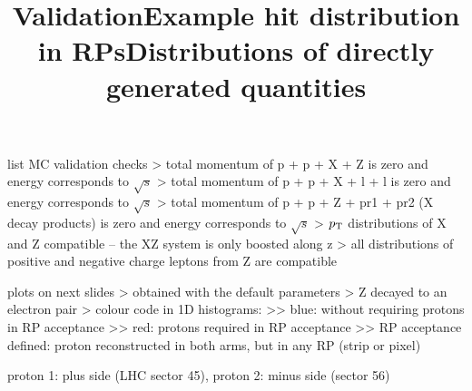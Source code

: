 \newpage %
\title{Validation}

\> list MC validation checks
\>> total momentum of p + p + X + Z is zero and energy corresponds to $\sqrt s$
\>> total momentum of p + p + X + l + l is zero and energy corresponds to $\sqrt s$
\>> total momentum of p + p + Z + pr1 + pr2 (X decay products) is zero and energy corresponds to $\sqrt s$
\>> $p_{\rm T}$ distributions of X and Z compatible -- the XZ system is only boosted along z
\>> all distributions of positive and negative charge leptons from Z are compatible

\> plots on next slides
\>> obtained with the default parameters
\>> Z decayed to an electron pair
\>> colour code in 1D histograms:
\>>> blue: without requiring protons in RP acceptance
\>>> red: protons required in RP acceptance
\>>> RP acceptance defined: proton reconstructed in both arms, but in any RP (strip or pixel)


\newpage %
\title{Example hit distribution in RPs}

\centerline{}


\newpage %
\title{Distributions of directly generated quantities}

\centerline{}

\newpage %

\> proton 1: plus side (LHC sector 45), proton 2: minus side (sector 56)

\centerline{}


\newpage %

\centerline{}


\newpage %

\centerline{}


\newpage %

\centerline{}


\newpage %

\centerline{}


\newpage %

\centerline{}

\vfil
\eject
\bye
